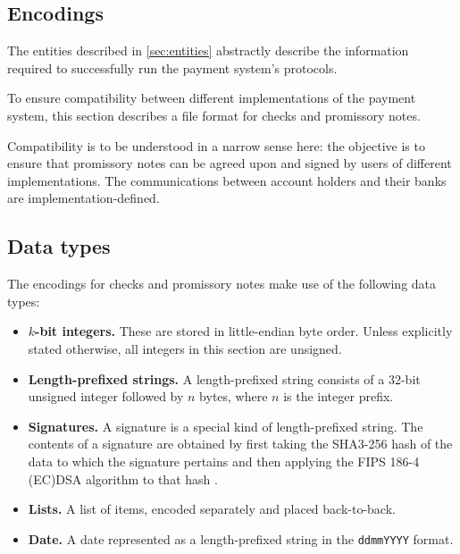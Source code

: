 \documentclass[12pt,a4paper]{article}
\begin{document}
\begin{multicols}{2}
	\section{Encodings}
	
	The entities described in \autoref{sec:entities} abstractly describe the information required to successfully run the payment system's protocols.
	
	To ensure compatibility between different implementations of the payment system, this section describes a file format for checks and promissory notes.
	
	Compatibility is to be understood in a narrow sense here: the objective is to ensure that promissory notes can be agreed upon and signed by users of different implementations. The communications between account holders and their banks are implementation-defined.
	
	\subsection{Data types}
	\label{sec:data-types}
	
	The encodings for checks and promissory notes make use of the following data types:
	
	\begin{itemize}
		\item \textbf{$k$-bit integers.} These are stored in little-endian byte order. Unless explicitly stated otherwise, all integers in this section are unsigned.
		
		\item \textbf{Length-prefixed strings.} A length-prefixed string consists of a 32-bit unsigned integer followed by $n$ bytes, where $n$ is the integer prefix.
		
		\item \textbf{Signatures.} A signature is a special kind of length-prefixed string. The contents of a signature are obtained by first taking the SHA3-256 hash of the data to which the signature pertains and then applying the FIPS 186-4 (EC)DSA algorithm to that hash \cite{fips-202-sha3, fips-186-4-dss}.
		
		\item \textbf{Lists.} A list of items, encoded separately and placed back-to-back.
		
		\item \textbf{Date.} A date represented as a length-prefixed string in the \texttt{ddmmYYYY} format.
		
	\end{itemize}


\end{multicols}
\end{document}
